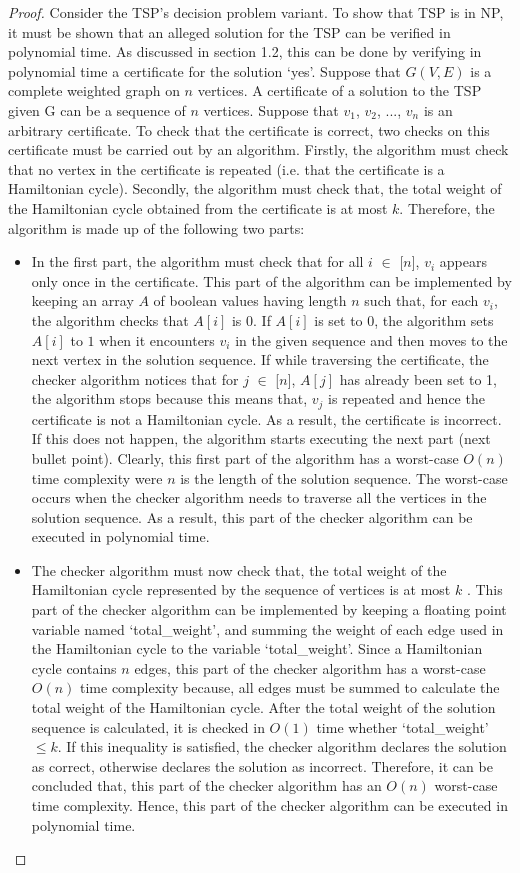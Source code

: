 \documentclass{article}
\begin{document}
\begin{proof}
Consider the TSP's decision problem variant. To show that TSP is in NP, it must be shown that an alleged solution for the TSP can be verified in polynomial time. As discussed in section 1.2, this can be done by verifying in polynomial time a certificate for the solution `yes'. Suppose that $G(V,E)$ is a complete weighted graph on $n$ vertices. A certificate of a solution to the TSP given G can be a sequence of $n$ vertices. Suppose that $v_1$, $v_2$, ..., $v_n$ is an arbitrary certificate. To check that the certificate is correct, two checks on this certificate must be carried out by an algorithm. Firstly, the algorithm must check that no vertex in the certificate is repeated (i.e. that the certificate is a Hamiltonian cycle). Secondly, the algorithm must check that, the total weight of the Hamiltonian cycle obtained from the certificate is at most $k$. Therefore, the algorithm is made up of the following two parts:
\begin{itemize}
   \item In the first part, the algorithm must check that for all $i$ $\in$ [$n$], $v_i$ appears only once in the certificate. This part of the algorithm can be implemented by keeping an array $A$ of boolean values having length $n$ such that, for each $v_i$, the algorithm checks that $A[i]$ is $0$. If $A[i]$ is set to $0$, the algorithm sets $A[i]$ to $1$ when it encounters $v_i$ in the given sequence and then moves to the next vertex in the solution sequence. If while traversing the certificate, the checker algorithm notices that for $j$ $\in$ [$n$], $A[j]$ has already been set to 1, the algorithm stops because this means that, $v_j$ is repeated and hence the certificate is not a Hamiltonian cycle. As a result, the certificate is incorrect. If this does not happen, the algorithm starts executing the next part (next bullet point). Clearly, this first part of the algorithm has a worst-case $O(n)$ time complexity were $n$ is the length of the solution sequence. The worst-case occurs when the checker algorithm needs to traverse all the vertices in the solution sequence. As a result, this part of the checker algorithm can be executed in polynomial time.
   \item The checker algorithm must now check that, the total weight of the Hamiltonian cycle represented by the sequence of vertices is at most $k$ . This part of the checker algorithm can be implemented by keeping a floating point variable named `total\_weight', and summing the weight of each edge used in the Hamiltonian cycle to the variable `total\_weight'. Since a Hamiltonian cycle contains $n$ edges, this part of the checker algorithm has a worst-case $O(n)$ time complexity because, all edges must be summed to calculate the total weight of the Hamiltonian cycle. After the total weight of the solution sequence is calculated, it is checked in $O(1)$ time whether `total\_weight' $\leq k$. If this inequality is satisfied, the checker algorithm declares the solution as correct, otherwise declares the solution as incorrect. Therefore, it can be concluded that, this part of the checker algorithm has an $O(n)$ worst-case time complexity. Hence, this part of the checker algorithm can be executed in polynomial time.

\end{itemize}
\end{proof}
\end{document}
